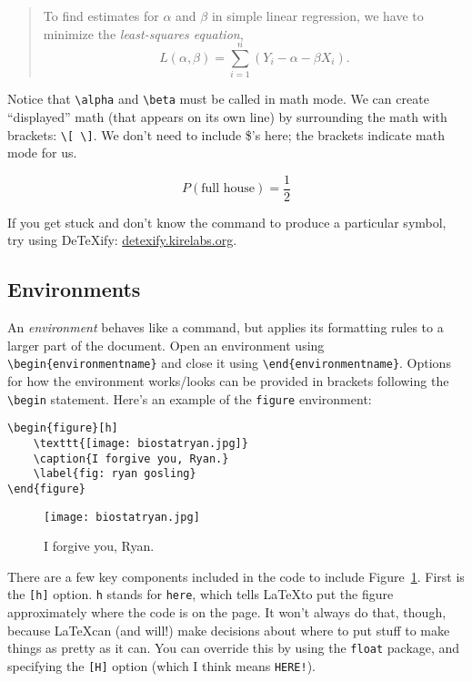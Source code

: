 \documentclass[12pt]{article}
\begin{document}
	\begin{quote}
		To find estimates for $\alpha$ and $\beta$ in simple linear regression, we have to minimize the \textit{least-squares equation},
		\[
			L(\alpha, \beta) = \sum_{i=1}^{n} \left(Y_{i} - \alpha - \beta X_{i}\right).
		\]
	\end{quote}
	
	Notice that \verb|\alpha| and \verb|\beta| must be called in math mode. We can create ``displayed'' math (that appears on its own line) by surrounding the math with brackets: \verb|\[ \]|. We don't need to include \$'s here; the brackets indicate math mode for us. 
	
	\[
		P(\text{full house}) = \frac{1}{2}
	\]
	
	If you get stuck and don't know the command to produce a particular symbol, try using DeTeXify: \url{detexify.kirelabs.org}.
	
	\subsection{Environments}
	
	An \textit{environment} behaves like a command, but applies its formatting rules to a larger part of the document. Open an environment using \verb|\begin{environmentname}| and close it using \verb|\end{environmentname}|. Options for how the environment works/looks can be provided in brackets following the \verb|\begin| statement. Here's an example of the \texttt{figure} environment:
	
	\begin{verbatim}
\begin{figure}[h]
    \texttt{[image: biostatryan.jpg]}
    \caption{I forgive you, Ryan.}
    \label{fig: ryan gosling}
\end{figure}
	\end{verbatim}
	
	\begin{figure}[h]
		\centering
		\texttt{[image: biostatryan.jpg]}
		\caption{I forgive you, Ryan.}
		\label{fig: ryan gosling}
	\end{figure}
	
	There are a few key components included in the code to include Figure~\ref{fig: ryan gosling}. First is the \verb|[h]| option. \texttt{h} stands for \texttt{here}, which tells \LaTeX to put the figure approximately where the code is on the page. It won't always do that, though, because \LaTeX can (and will!) make decisions about where to put stuff to make things as pretty as it can. You can override this by using the \texttt{float} package, and specifying the \verb|[H]| option (which I think means \texttt{HERE!}).
	
\end{document}

